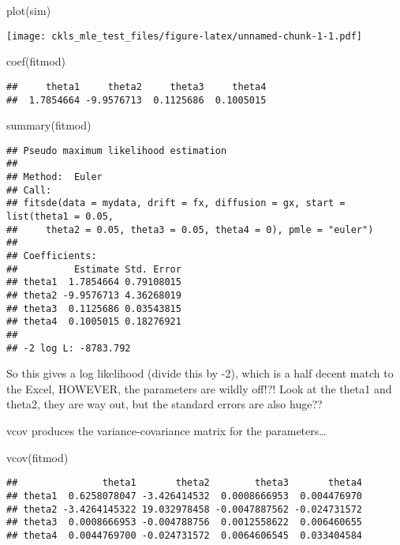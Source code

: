 \documentclass[
]{article}
\newenvironment{Shaded}{\begin{snugshade}}{\end{snugshade}}
\newcommand{\FunctionTok}[1]{\textcolor[rgb]{0.00,0.00,0.00}{#1}}
\newcommand{\NormalTok}[1]{#1}
\begin{document}
\begin{Shaded}
\begin{Highlighting}[]
\FunctionTok{plot}\NormalTok{(sim)}
\end{Highlighting}
\end{Shaded}

\texttt{[image: ckls\_mle\_test\_files/figure-latex/unnamed-chunk-1-1.pdf]}

\begin{Shaded}
\begin{Highlighting}[]
\FunctionTok{coef}\NormalTok{(fitmod) }
\end{Highlighting}
\end{Shaded}

\begin{verbatim}
##     theta1     theta2     theta3     theta4 
##  1.7854664 -9.9576713  0.1125686  0.1005015
\end{verbatim}

\begin{Shaded}
\begin{Highlighting}[]
\FunctionTok{summary}\NormalTok{(fitmod) }
\end{Highlighting}
\end{Shaded}

\begin{verbatim}
## Pseudo maximum likelihood estimation
## 
## Method:  Euler
## Call:
## fitsde(data = mydata, drift = fx, diffusion = gx, start = list(theta1 = 0.05, 
##     theta2 = 0.05, theta3 = 0.05, theta4 = 0), pmle = "euler")
## 
## Coefficients:
##          Estimate Std. Error
## theta1  1.7854664 0.79108015
## theta2 -9.9576713 4.36268019
## theta3  0.1125686 0.03543815
## theta4  0.1005015 0.18276921
## 
## -2 log L: -8783.792
\end{verbatim}

So this gives a log likelihood (divide this by -2), which is a half
decent match to the Excel, HOWEVER, the parameters are wildly off!?!
Look at the theta1 and theta2, they are way out, but the standard errors
are also huge??

vcov produces the variance-covariance matrix for the parameters\ldots{}

\begin{Shaded}
\begin{Highlighting}[]
\FunctionTok{vcov}\NormalTok{(fitmod)}
\end{Highlighting}
\end{Shaded}

\begin{verbatim}
##               theta1       theta2        theta3       theta4
## theta1  0.6258078047 -3.426414532  0.0008666953  0.004476970
## theta2 -3.4264145322 19.032978458 -0.0047887562 -0.024731572
## theta3  0.0008666953 -0.004788756  0.0012558622  0.006460655
## theta4  0.0044769700 -0.024731572  0.0064606545  0.033404584
\end{verbatim}
\end{document}
